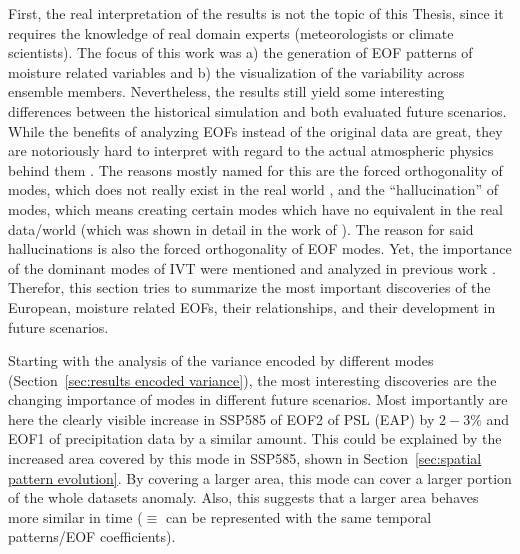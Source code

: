 First, the real interpretation of the results is not the topic of this Thesis, since it requires the knowledge of real domain experts (meteorologists or climate scientists). 
The focus of this work was a) the generation of EOF patterns of moisture related variables and b) the visualization of the variability across ensemble members. 
Nevertheless, the results still yield some interesting differences between the historical simulation and both evaluated future scenarios. 
While the benefits of analyzing EOFs instead of the original data are great, they are notoriously hard to interpret with regard to the actual atmospheric physics behind them \cite{dommenget_cautionary_2002, hannachi_empirical_2007}.
The reasons mostly named for this are the forced orthogonality of modes, which does not really exist in the real world \cite{hannachi_empirical_2007}, and the \enquote{hallucination} of modes, which means creating certain modes which have no equivalent in the real data/world (which was shown in detail in the work of ). 
The reason for said hallucinations is also the forced orthogonality of EOF modes. 
Yet, the importance of the dominant modes of IVT were mentioned and analyzed in previous work \cite{salstein_modes_1983, zou_interdecadal_2018}. 
Therefor, this section tries to summarize the most important discoveries of the European, moisture related EOFs, their relationships, and their development in future scenarios. 

Starting with the analysis of the variance encoded by different modes (Section~\ref{sec:results encoded variance}), the most interesting discoveries are the changing importance of modes in different future scenarios. 
Most importantly are here the clearly visible increase in SSP585 of EOF2 of PSL (EAP) by $2-3 \%$ and EOF1 of precipitation data by a similar amount. 
This could be explained by the increased area covered by this mode in SSP585, shown in Section~\ref{sec:spatial pattern evolution}. 
By covering a larger area, this mode can cover a larger portion of the whole datasets anomaly. 
Also, this suggests that a larger area behaves more similar in time ($\equiv$ can be represented with the same temporal patterns/EOF coefficients). 


